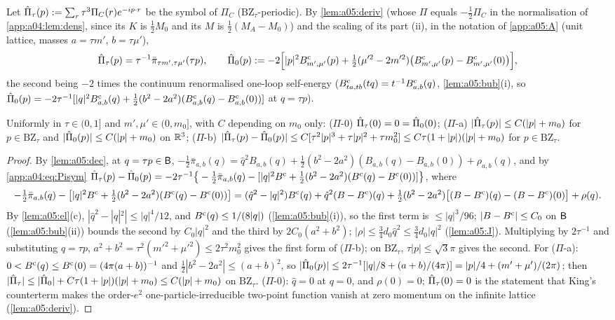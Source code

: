 Let $\hat\Pi_\tau(p):=\sum_r\tau^3\Pi_C(r)e^{-ip\cdot r}$ be the symbol of $\Pi_C$ ($\mathrm{BZ}_\tau$-periodic). By \cref{lem:a05:deriv} (whose $\Pi$ equals $-\tfrac12\Pi_C$ in the normalisation of \cref{app:a04:lem:dens}, since its $K$ is $\tfrac12M_0$ and its $M$ is $\tfrac12(M_A-M_0)$) and the scaling of its part (ii), in the notation of \cref{app:a05:A} (unit lattice, masses $a=\tau m'$, $b=\tau\mu'$),
\begin{equation}\label{app:a04:eq:Pisym}
\hat\Pi_\tau(p)=\tau^{-1}\bar\pi_{\tau m',\tau\mu'}(\tau p),\qquad
\hat\Pi_0(p):=-2\Big[|p|^2B^{\mathrm c}_{m',\mu'}(p)+\tfrac12(\mu'^2-2m'^2)\big(B^{\mathrm c}_{m',\mu'}(p)-B^{\mathrm c}_{m',\mu'}(0)\big)\Big],
\end{equation}
the second being $-2$ times the continuum renormalised one-loop self-energy ($B^{\mathrm c}_{ta,tb}(tq)=t^{-1}B^{\mathrm c}_{a,b}(q)$, \cref{lem:a05:bub}(i), so $\hat\Pi_0(p)=-2\tau^{-1}[|q|^2B^{\mathrm c}_{a,b}(q)+\frac12(b^2-2a^2)(B^{\mathrm c}_{a,b}(q)-B^{\mathrm c}_{a,b}(0))]$ at $q=\tau p$).

\begin{lemma}\label{app:a04:lem:Pi}
Uniformly in $\tau\in(0,1]$ and $m',\mu'\in(0,m_0]$, with $C$ depending on $m_0$ only:
\textup{($\Pi$-0)} $\hat\Pi_\tau(0)=0=\hat\Pi_0(0)$;\quad
\textup{($\Pi$-a)} $|\hat\Pi_\tau(p)|\le C(|p|+m_0)$ for $p\in\mathrm{BZ}_\tau$ and $|\hat\Pi_0(p)|\le C(|p|+m_0)$ on $\mathbb R^3$;\quad
\textup{($\Pi$-b)} $|\hat\Pi_\tau(p)-\hat\Pi_0(p)|\le C[\tau^2|p|^3+\tau|p|^2+\tau m_0^2]\le C\tau(1+|p|)(|p|+m_0)$ for $p\in\mathrm{BZ}_\tau$.
\end{lemma}
\begin{proof}
By \cref{lem:a05:dec}, at $q=\tau p\in\mathsf B$, $-\frac12\bar\pi_{a,b}(q)=\hat q^2B_{a,b}(q)+\frac12(b^2-2a^2)(B_{a,b}(q)-B_{a,b}(0))+\rho_{a,b}(q)$, and by \eqref{app:a04:eq:Pisym} $\hat\Pi_\tau(p)-\hat\Pi_0(p)=-2\tau^{-1}\big\{-\frac12\bar\pi_{a,b}(q)-[|q|^2B^{\mathrm c}+\frac12(b^2-2a^2)(B^{\mathrm c}(q)-B^{\mathrm c}(0))]\big\}$, where
\[
-\tfrac12\bar\pi_{a,b}(q)-\big[|q|^2B^{\mathrm c}+\tfrac12(b^2-2a^2)(B^{\mathrm c}(q)-B^{\mathrm c}(0))\big]=(\hat q^2-|q|^2)B^{\mathrm c}(q)+\hat q^2(B-B^{\mathrm c})(q)+\tfrac12(b^2-2a^2)\big[(B-B^{\mathrm c})(q)-(B-B^{\mathrm c})(0)\big]+\rho(q).
\]
By \cref{lem:a05:el}(c), $|\hat q^2-|q|^2|\le|q|^4/12$, and $B^{\mathrm c}(q)\le1/(8|q|)$ (\cref{lem:a05:bub}(i)), so the first term is $\le|q|^3/96$; $|B-B^{\mathrm c}|\le C_0$ on $\mathsf B$ (\cref{lem:a05:bub}(ii)) bounds the second by $C_0|q|^2$ and the third by $2C_0(a^2+b^2)$; $|\rho|\le\frac34d_0\hat q^2\le\frac34d_0|q|^2$ (\cref{lem:a05:J}). Multiplying by $2\tau^{-1}$ and substituting $q=\tau p$, $a^2+b^2=\tau^2(m'^2+\mu'^2)\le2\tau^2m_0^2$ gives the first form of ($\Pi$-b); on $\mathrm{BZ}_\tau$, $\tau|p|\le\sqrt3\pi$ gives the second. For ($\Pi$-a): $0<B^{\mathrm c}(q)\le B^{\mathrm c}(0)=(4\pi(a+b))^{-1}$ and $\frac12|b^2-2a^2|\le(a+b)^2$, so $|\hat\Pi_0(p)|\le2\tau^{-1}[|q|/8+(a+b)/(4\pi)]=|p|/4+(m'+\mu')/(2\pi)$; then $|\hat\Pi_\tau|\le|\hat\Pi_0|+C\tau(1+|p|)(|p|+m_0)\le C(|p|+m_0)$ on $\mathrm{BZ}_\tau$. ($\Pi$-0): $\hat q=0$ at $q=0$, and $\rho(0)=0$; $\hat\Pi_\tau(0)=0$ is the statement that King's counterterm \cite[(3.33)]{K1} makes the order-$e^2$ one-particle-irreducible two-point function vanish at zero momentum on the infinite lattice (\cref{lem:a05:deriv}).
\end{proof}
